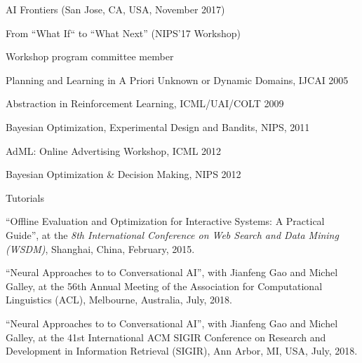 \documentclass[10pt,twoside,letterpaper]{article}
\newcommand{\venuefont}[1]{{\textit{#1}}}
\newcommand{\negitemspace}{\vspace{1mm}}
\begin{document}
\begin{compactitem}
\begin{compactitem}
\begin{compactitem}
\item{AI Frontiers (San Jose, CA, USA, November 2017)}

\item{From “What If“ to “What Next” (NIPS’17 Workshop)}

\end{compactitem}

\item{Workshop program committee member}

\begin{compactitem}

\item{Planning and Learning in A Priori Unknown or Dynamic Domains, IJCAI 2005}

\item{Abstraction in Reinforcement Learning, ICML/UAI/COLT 2009}

\item{Bayesian Optimization, Experimental Design and Bandits, NIPS, 2011}

\item{AdML: Online Advertising Workshop, ICML 2012}

\item{Bayesian Optimization \& Decision Making, NIPS 2012}

\end{compactitem}

\end{compactitem} \negitemspace

\item{Tutorials} \negitemspace

\begin{compactitem}

\item{``Offline Evaluation and Optimization for Interactive Systems: A Practical Guide'', at the \venuefont{8th International Conference on Web Search and Data Mining (WSDM)}, Shanghai, China, February, 2015.}

\item{``Neural Approaches to to Conversational AI'', with Jianfeng Gao and Michel Galley, at the 56th
Annual Meeting of the Association for Computational Linguistics (ACL), Melbourne, Australia, July, 2018.}

\item{``Neural Approaches to to Conversational AI'', with Jianfeng Gao and Michel Galley, at the 41st
International ACM SIGIR Conference on Research and Development in Information Retrieval (SIGIR), Ann Arbor, MI, USA, July, 2018.}


\end{compactitem}
\end{compactitem}
\end{document}

